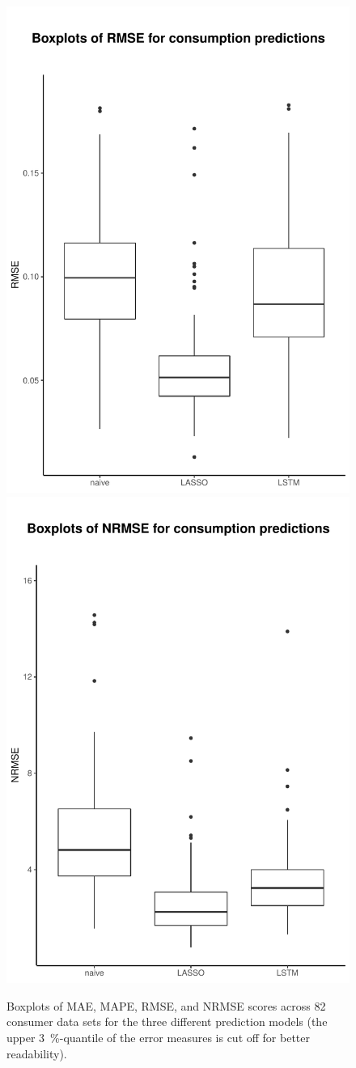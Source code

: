 \begin{figure}
    \includegraphics[width=.5\textwidth-5pt]{thesis/graphs/evaluation/c_boxplot_RMSE.pdf}
    \includegraphics[width=.5\textwidth-5pt]{thesis/graphs/evaluation/c_boxplot_NRMSE.pdf} \\
    \caption[Boxplots of MAE, MAPE, RMSE, and NRMSE scores across consumer data sets]{Boxplots of MAE, MAPE, RMSE, and NRMSE scores across 82 consumer data sets for the three different prediction models (the upper 3~\%-quantile of the error measures is cut off for better readability). \quantnet\href{}{}}
    \label{Fig:boxplots_errormeasures}
\end{figure}
%

